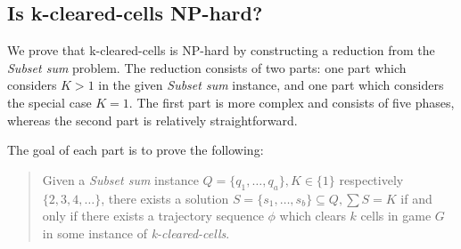 \subsection{Is k-cleared-cells NP-hard?}

We prove that k-cleared-cells is NP-hard by constructing a reduction from the \textit{Subset sum} problem. The reduction consists of two parts: one part which considers $K > 1$ in the given \textit{Subset sum} instance, and one part which considers the special case $K = 1$. The first part is more complex and consists of five phases, whereas the second part is relatively straightforward.

The goal of each part is to prove the following: 

\begin{quote}
Given a \textit{Subset sum} instance $Q = \{q_1, \ldots, q_a\}, K \in \{1\}$ respectively $\{2, 3, 4, \ldots \}$, there exists a solution $S = \{s_1, \ldots, s_b \} \subseteq Q, \sum S = K$ if and only if there exists a trajectory sequence $\phi$ which clears $k$ cells in game $G$ in some instance of \textit{k-cleared-cells}.
\end{quote}












